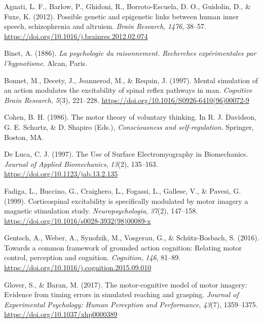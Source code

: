 \documentclass[a4paper,12pt,twoside,openright,oldfontcommands]{memoir}
\begin{document}
\noindent
\setlength{\parindent}{-0.20in} \setlength{\leftskip}{0.20in}
\setlength{\parskip}{8pt}

\hypertarget{refs}{}
\hypertarget{ref-agnati_possible_2012}{}
Agnati, L. F., Barlow, P., Ghidoni, R., Borroto-Escuela, D. O.,
Guidolin, D., \& Fuxe, K. (2012). Possible genetic and epigenetic links
between human inner speech, schizophrenia and altruism. \emph{Brain
Research}, \emph{1476}, 38--57.
\url{https://doi.org/10.1016/j.brainres.2012.02.074}

\hypertarget{ref-binet_psychologie_1886}{}
Binet, A. (1886). \emph{La psychologie du raisonnement. Recherches
expérimentales par l'hypnotisme}. Alcan, Paris.

\hypertarget{ref-bonnet_mental_1997}{}
Bonnet, M., Decety, J., Jeannerod, M., \& Requin, J. (1997). Mental
simulation of an action modulates the excitability of spinal reflex
pathways in man. \emph{Cognitive Brain Research}, \emph{5}(3), 221--228.
\url{https://doi.org/10.1016/S0926-6410(96)00072-9}

\hypertarget{ref-cohen_motor_1986}{}
Cohen, B. H. (1986). The motor theory of voluntary thinking. In R. J.
Davidson, G. E. Schartz, \& D. Shapiro (Eds.), \emph{Consciousness and
self-regulation}. Springer, Boston, MA.

\hypertarget{ref-de_luca_use_1997}{}
De Luca, C. J. (1997). The Use of Surface Electromyography in
Biomechanics. \emph{Journal of Applied Biomechanics}, \emph{13}(2),
135--163. \url{https://doi.org/10.1123/jab.13.2.135}

\hypertarget{ref-fadiga_corticospinal_1999}{}
Fadiga, L., Buccino, G., Craighero, L., Fogassi, L., Gallese, V., \&
Pavesi, G. (1999). Corticospinal excitability is specifically modulated
by motor imagery a magnetic stimulation study. \emph{Neuropsychologia},
\emph{37}(2), 147--158.
\url{https://doi.org/10.1016/s0028-3932(98)00089-x}

\hypertarget{ref-gentsch_towards_2016}{}
Gentsch, A., Weber, A., Synofzik, M., Vosgerau, G., \& Schütz-Bosbach,
S. (2016). Towards a common framework of grounded action cognition:
Relating motor control, perception and cognition. \emph{Cognition},
\emph{146}, 81--89.
\url{https://doi.org/10.1016/j.cognition.2015.09.010}

\hypertarget{ref-glover_motor-cognitive_2017}{}
Glover, S., \& Baran, M. (2017). The motor-cognitive model of motor
imagery: Evidence from timing errors in simulated reaching and grasping.
\emph{Journal of Experimental Psychology: Human Perception and
Performance}, \emph{43}(7), 1359--1375.
\url{https://doi.org/10.1037/xhp0000389}
\end{document}

